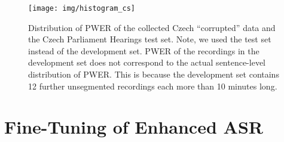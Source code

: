 \begin{figure}[t]
	\texttt{[image: img/histogram\_cs]}
	\caption{Distribution of PWER of the collected Czech ``corrupted'' data and the Czech Parliament Hearings test set. Note, we used the test set instead of the development set. PWER of the recordings in the development set does not correspond to the actual sentence-level distribution of PWER. This is because the development set contains 12  further unsegmented recordings each more than 10 minutes long.}
	\label{fig:histogram_cs}
\end{figure}

\section{Fine-Tuning of Enhanced ASR}















